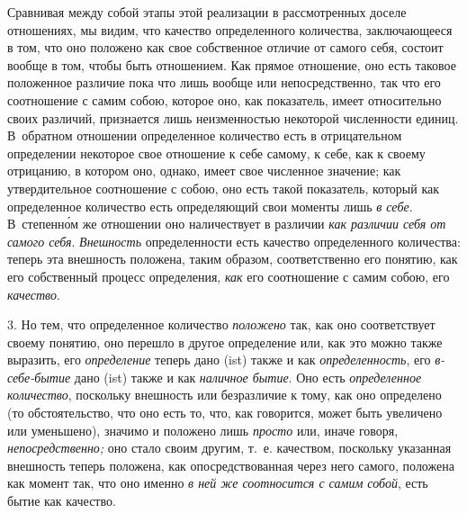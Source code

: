 Сравнивая между собой этапы этой реализации в рассмотренных доселе
отношениях, мы видим, что качество определенного количества, заключающееся
в том, что оно положено как свое собственное отличие от самого себя,
состоит вообще в том, чтобы быть отношением. Как прямое отношение, оно есть
таковое положенное различие пока что лишь вообще или непосредственно, так
что его соотношение с самим собою, которое оно, как показатель, имеет
относительно своих различий, признается лишь неизменностью некоторой
численности единиц. В~обратном отношении определенное количество есть в
отрицательном определении некоторое свое отношение к себе самому, к себе,
как к своему отрицанию, в котором оно, однако, имеет свое численное
значение; как утвердительное соотношение с собою, оно есть такой
показатель, который как определенное количество есть определяющий свои
моменты лишь {\em в себе}. В~степенн\'{о}м же отношении оно
наличествует в различии {\em как различии себя от
самого себя}. {\em Внешность} определенности есть
качество определенного количества: теперь эта внешность положена, таким
образом, соответственно его понятию, как его собственный процесс
определения, {\em как} его соотношение с самим собою,
его {\em качество}.

3. Но тем, что определенное количество {\em положено}
так, как оно соответствует своему понятию, оно перешло в другое определение
или, как это можно также выразить, его
{\em определение} теперь дано (ist) также и как
{\em определенность}, его
{\em в-себе-бытие} дано (ist) также и как
{\em наличное бытие}. Оно есть
{\em определенное количество}, поскольку внешность или
безразличие к тому, как оно определено (то обстоятельство, что оно есть то,
что, как говорится, может быть увеличено или уменьшено), значимо и положено
лишь {\em просто} или, иначе говоря,
{\em непосредственно;} оно стало своим другим, т.~е.
качеством, поскольку указанная внешность теперь положена, как
опосредствованная через него самого, положена как момент так, что оно
именно {\em в ней же соотносится с самим собой}, есть
бытие как качество.

